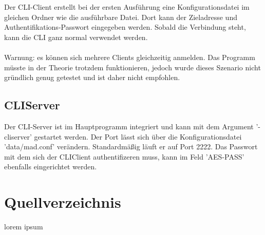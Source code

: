 \documentclass[11pt,a4paper]{report}
\begin{document}
Der CLI-Client erstellt bei der ersten Ausführung eine Konfigurationsdatei im gleichen Ordner wie die ausführbare Datei. Dort kann der Zieladresse und Authentifikations-Passwort eingegeben werden. Sobald die Verbindung steht, kann die CLI ganz normal verwendet werden.\\\\
Warnung: es können sich mehrere Clients gleichzeitig anmelden. Das Programm müsste in der Theorie trotzdem funktionieren, jedoch wurde dieses Szenario nicht gründlich genug getestet und ist daher nicht empfohlen.

\chapter{CLIServer}

Der CLI-Server ist im Hauptprogramm integriert und kann mit dem Argument '-cliserver' gestartet werden. Der Port lässt sich über die Konfigurationsdatei 'data/mad.conf' verändern. Standardmäßig läuft er auf Port 2222. Das Passwort mit dem sich der CLIClient authentifizeren muss, kann im Feld 'AES-PASS' ebenfalls eingerichtet werden.

\part{Quellverzeichnis}
lorem ipsum
\end{document}
